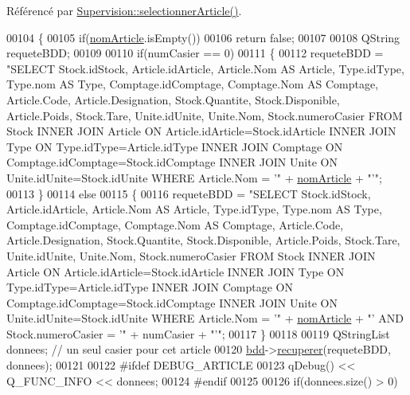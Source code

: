 Référencé par \hyperlink{_supervision_8cpp_source_l00320}{Supervision\+::selectionner\+Article()}.


\begin{DoxyCode}
00104 \{
00105     \textcolor{keywordflow}{if}(\hyperlink{class_article_a0ba6c08f7dd54e4b7caf673ecd6b41a6}{nomArticle}.isEmpty())
00106         \textcolor{keywordflow}{return} \textcolor{keyword}{false};
00107 
00108     QString requeteBDD;
00109 
00110     \textcolor{keywordflow}{if}(numCasier == 0)
00111     \{
00112         requeteBDD = \textcolor{stringliteral}{"SELECT Stock.idStock, Article.idArticle, Article.Nom AS Article, Type.idType,
       Type.nom AS Type, Comptage.idComptage, Comptage.Nom AS Comptage, Article.Code, Article.Designation, Stock.Quantite,
       Stock.Disponible, Article.Poids, Stock.Tare, Unite.idUnite, Unite.Nom, Stock.numeroCasier FROM Stock INNER
       JOIN Article ON Article.idArticle=Stock.idArticle INNER JOIN Type ON Type.idType=Article.idType INNER JOIN
       Comptage ON Comptage.idComptage=Stock.idComptage INNER JOIN Unite ON Unite.idUnite=Stock.idUnite WHERE
       Article.Nom = '"} + \hyperlink{class_article_a0ba6c08f7dd54e4b7caf673ecd6b41a6}{nomArticle} + \textcolor{stringliteral}{"'"};
00113     \}
00114     \textcolor{keywordflow}{else}
00115     \{
00116         requeteBDD = \textcolor{stringliteral}{"SELECT Stock.idStock, Article.idArticle, Article.Nom AS Article, Type.idType,
       Type.nom AS Type, Comptage.idComptage, Comptage.Nom AS Comptage, Article.Code, Article.Designation, Stock.Quantite,
       Stock.Disponible, Article.Poids, Stock.Tare, Unite.idUnite, Unite.Nom, Stock.numeroCasier FROM Stock INNER
       JOIN Article ON Article.idArticle=Stock.idArticle INNER JOIN Type ON Type.idType=Article.idType INNER JOIN
       Comptage ON Comptage.idComptage=Stock.idComptage INNER JOIN Unite ON Unite.idUnite=Stock.idUnite WHERE
       Article.Nom = '"} + \hyperlink{class_article_a0ba6c08f7dd54e4b7caf673ecd6b41a6}{nomArticle} + \textcolor{stringliteral}{"' AND Stock.numeroCasier = '"} + numCasier + \textcolor{stringliteral}{"'"};
00117     \}
00118 
00119     QStringList donnees; \textcolor{comment}{// un seul casier pour cet article}
00120     \hyperlink{class_article_a7221cec4212d86d74f479b9ee683ee8a}{bdd}->\hyperlink{class_bdd_a8f25d29d309041bbf875700db0efd97b}{recuperer}(requeteBDD, donnees);
00121 
00122 \textcolor{preprocessor}{    #ifdef DEBUG\_ARTICLE}
00123         qDebug() << Q\_FUNC\_INFO << donnees;
00124 \textcolor{preprocessor}{    #endif}
00125 
00126     \textcolor{keywordflow}{if}(donnees.size() > 0)

\end{DoxyCode}
